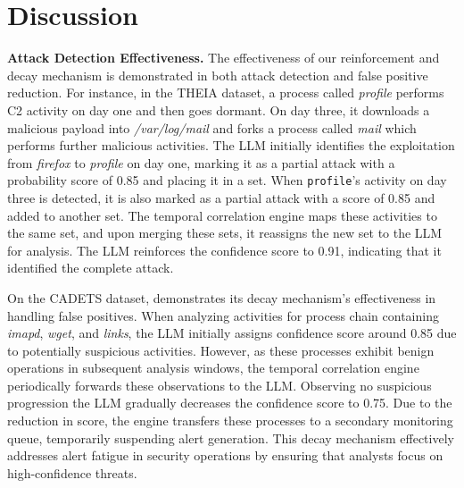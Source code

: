 \section{Discussion}\label{sec:discussion}
\noindent\textbf{Attack Detection Effectiveness.} The effectiveness of our reinforcement and decay mechanism is demonstrated in both attack detection and false positive reduction. 
For instance, in the THEIA dataset, a process called \textit{profile} performs C2 activity on day one and then goes dormant. 
On day three, it downloads a malicious payload into \textit{/var/log/mail} and forks a process called \textit{mail} which performs further malicious activities. 
The LLM initially identifies the exploitation from \textit{firefox} to \textit{profile} on day one, marking it as a partial attack with a probability score of 0.85 and placing it in a set. 
When \texttt{profile}'s activity on day three is detected, it is also marked as a partial attack with a score of 0.85 and added to another set. 
The temporal correlation engine maps these activities to the same set, and upon merging these sets, it reassigns the new set to the LLM for analysis. The LLM reinforces the confidence score to 0.91, indicating that it identified the complete attack.

\noindent On the CADETS dataset, \method demonstrates its decay mechanism's effectiveness in handling false positives. 
When analyzing activities for process chain containing \textit{imapd}, \textit{wget}, and \textit{links}, the LLM initially assigns confidence score around 0.85 due to potentially suspicious activities. 
However, as these processes exhibit benign operations in subsequent analysis windows, the temporal correlation engine periodically forwards these observations to the LLM. 
Observing no suspicious progression the LLM gradually decreases the confidence score to 0.75. 
Due to the reduction in score, the engine transfers these processes to a secondary monitoring queue, temporarily suspending alert generation. 
This decay mechanism effectively addresses alert fatigue in security operations by ensuring that analysts focus on high-confidence threats. \\

